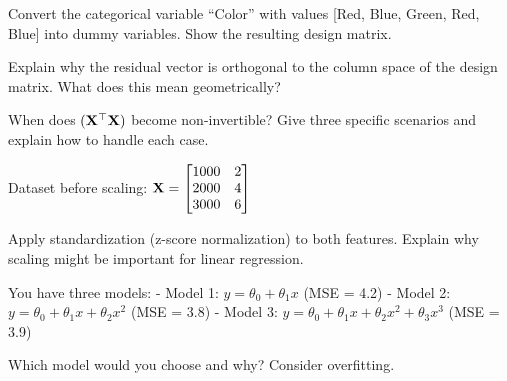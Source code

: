 \documentclass{article}
\newcounter{exercise}
\begin{document}
\begin{tcolorbox}[colback=gray!5!white,colframe=gray!75!black,title=Problem \stepcounter{exercise}: Dummy Variables]

Convert the categorical variable ``Color'' with values [Red, Blue, Green, Red, Blue] into dummy variables. Show the resulting design matrix.
\end{tcolorbox}

\begin{tcolorbox}[colback=gray!5!white,colframe=gray!75!black,title=Problem \stepcounter{exercise}: Geometric Interpretation]

Explain why the residual vector is orthogonal to the column space of the design matrix. What does this mean geometrically?
\end{tcolorbox}

\begin{tcolorbox}[colback=gray!5!white,colframe=gray!75!black,title=Problem \stepcounter{exercise}: Non-invertible Matrix]

When does $(\mathbf{X}^\top \mathbf{X})$ become non-invertible? Give three specific scenarios and explain how to handle each case.
\end{tcolorbox}

\begin{tcolorbox}[colback=gray!5!white,colframe=gray!75!black,title=Problem \stepcounter{exercise}: Feature Scaling]

Dataset before scaling: $\mathbf{X} = \begin{bmatrix} 1000 & 2 \\ 2000 & 4 \\ 3000 & 6 \end{bmatrix}$

Apply standardization (z-score normalization) to both features. Explain why scaling might be important for linear regression.
\end{tcolorbox}

\begin{tcolorbox}[colback=gray!5!white,colframe=gray!75!black,title=Problem \stepcounter{exercise}: Model Selection]

You have three models:
- Model 1: $y = \theta_0 + \theta_1 x$ (MSE = 4.2)
- Model 2: $y = \theta_0 + \theta_1 x + \theta_2 x^2$ (MSE = 3.8)  
- Model 3: $y = \theta_0 + \theta_1 x + \theta_2 x^2 + \theta_3 x^3$ (MSE = 3.9)

Which model would you choose and why? Consider overfitting.
\end{tcolorbox}
\end{document}
